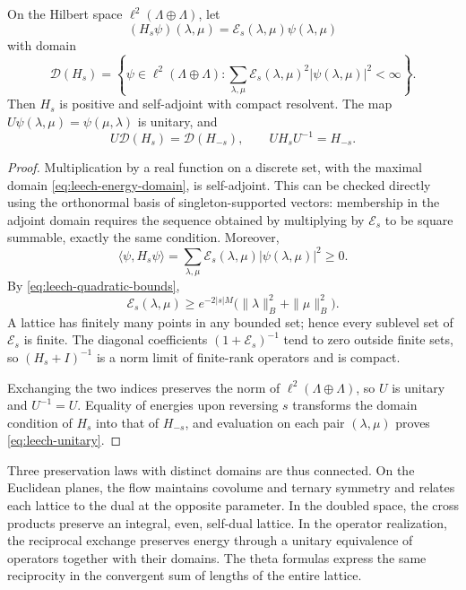 \begin{theorem}
\label{thm:leech-energy}
On the Hilbert space \(\ell^2(\Lambda\oplus\Lambda)\), let
\[
 (H_s\psi)(\lambda,\mu)=
       \mathcal E_s(\lambda,\mu)\psi(\lambda,\mu)
\]
with domain
\begin{equation}
 \mathcal D(H_s)=
 \left\{\psi\in\ell^2(\Lambda\oplus\Lambda):
 \sum_{\lambda,\mu}\mathcal E_s(\lambda,\mu)^2
             |\psi(\lambda,\mu)|^2<\infty\right\}.
 \label{eq:leech-energy-domain}
\end{equation}
Then \(H_s\) is positive and self-adjoint with compact resolvent.
The map \(U\psi(\lambda,\mu)=\psi(\mu,\lambda)\) is unitary, and
\begin{equation}
 U\mathcal D(H_s)=\mathcal D(H_{-s}),\qquad
 UH_sU^{-1}=H_{-s}.
 \label{eq:leech-unitary}
\end{equation}
\end{theorem}
\begin{proof}
Multiplication by a real function on a discrete set,
with the maximal domain \eqref{eq:leech-energy-domain}, is
self-adjoint. This can be checked directly using the orthonormal
basis of singleton-supported vectors: membership
in the adjoint domain requires the sequence obtained by
multiplying by \(\mathcal E_s\) to be square summable, exactly
the same condition. Moreover,
\[
 \langle\psi,H_s\psi\rangle
   =\sum_{\lambda,\mu}\mathcal E_s(\lambda,\mu)
                         |\psi(\lambda,\mu)|^2\geq0.
\]
By \eqref{eq:leech-quadratic-bounds},
\[
 \mathcal E_s(\lambda,\mu)\geq
 e^{-2|s|M}\bigl(\|\lambda\|_B^2+\|\mu\|_B^2\bigr).
\]
A lattice has finitely many points in any bounded set;
hence every sublevel set of \(\mathcal E_s\) is finite. The diagonal
coefficients \((1+\mathcal E_s)^{-1}\) tend to zero outside
finite sets, so \((H_s+I)^{-1}\) is a norm limit
of finite-rank operators and is compact.

Exchanging the two indices preserves the norm of
\(\ell^2(\Lambda\oplus\Lambda)\), so \(U\) is unitary
and \(U^{-1}=U\). Equality of energies upon reversing \(s\) transforms
the domain condition of \(H_s\) into that of \(H_{-s}\), and
evaluation on each pair \((\lambda,\mu)\) proves
\eqref{eq:leech-unitary}.
\end{proof}

Three preservation laws with distinct domains are thus connected.
On the Euclidean planes, the flow maintains covolume and ternary
symmetry and relates each lattice to the dual at the opposite parameter.
In the doubled space, the cross products preserve an
integral, even, self-dual lattice. In the operator realization, the
reciprocal exchange preserves energy through a unitary
equivalence of operators together with their domains. The theta formulas
express the same reciprocity in the convergent sum of
lengths of the entire lattice.
